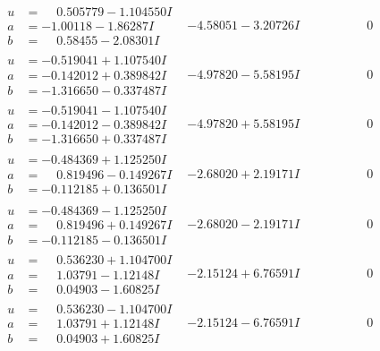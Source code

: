 \documentclass[1p]{elsarticle_modified}
\theoremstyle{definition}
\begin{document}
$$\begin{array}{c|c|c}
\begin{aligned}
u &= \phantom{-}0.505779 - 1.104550 I \\
a &= -1.00118 - 1.86287 I \\
b &= \phantom{-}0.58455 - 2.08301 I\end{aligned}
 & -4.58051 - 3.20726 I & \phantom{-0.000000 } 0 \\ \hline\begin{aligned}
u &= -0.519041 + 1.107540 I \\
a &= -0.142012 + 0.389842 I \\
b &= -1.316650 - 0.337487 I\end{aligned}
 & -4.97820 - 5.58195 I & \phantom{-0.000000 } 0 \\ \hline\begin{aligned}
u &= -0.519041 - 1.107540 I \\
a &= -0.142012 - 0.389842 I \\
b &= -1.316650 + 0.337487 I\end{aligned}
 & -4.97820 + 5.58195 I & \phantom{-0.000000 } 0 \\ \hline\begin{aligned}
u &= -0.484369 + 1.125250 I \\
a &= \phantom{-}0.819496 - 0.149267 I \\
b &= -0.112185 + 0.136501 I\end{aligned}
 & -2.68020 + 2.19171 I & \phantom{-0.000000 } 0 \\ \hline\begin{aligned}
u &= -0.484369 - 1.125250 I \\
a &= \phantom{-}0.819496 + 0.149267 I \\
b &= -0.112185 - 0.136501 I\end{aligned}
 & -2.68020 - 2.19171 I & \phantom{-0.000000 } 0 \\ \hline\begin{aligned}
u &= \phantom{-}0.536230 + 1.104700 I \\
a &= \phantom{-}1.03791 - 1.12148 I \\
b &= \phantom{-}0.04903 - 1.60825 I\end{aligned}
 & -2.15124 + 6.76591 I & \phantom{-0.000000 } 0 \\ \hline\begin{aligned}
u &= \phantom{-}0.536230 - 1.104700 I \\
a &= \phantom{-}1.03791 + 1.12148 I \\
b &= \phantom{-}0.04903 + 1.60825 I\end{aligned}
 & -2.15124 - 6.76591 I & \phantom{-0.000000 } 0 \\ \hline\begin{aligned}

\end{aligned}
\end{array}$$
\end{document}
